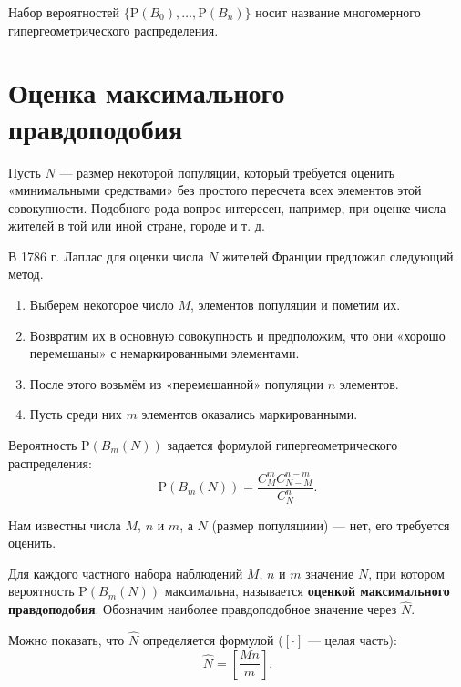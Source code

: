 \documentclass[11pt,a4paper]{article}
\providecommand{\tightlist}{%
      \setlength{\itemsep}{0pt}\setlength{\parskip}{0pt}}
\begin{document}
Набор вероятностей \(\{\mathrm{P}(B_0), \ldots,\mathrm{P}(B_n)\}\) носит
название многомерного гипергеометрического распределения.

    \hypertarget{ux43eux446ux435ux43dux43aux430-ux43cux430ux43aux441ux438ux43cux430ux43bux44cux43dux43eux433ux43e-ux43fux440ux430ux432ux434ux43eux43fux43eux434ux43eux431ux438ux44f}{%
\section{Оценка максимального
правдоподобия}\label{ux43eux446ux435ux43dux43aux430-ux43cux430ux43aux441ux438ux43cux430ux43bux44cux43dux43eux433ux43e-ux43fux440ux430ux432ux434ux43eux43fux43eux434ux43eux431ux438ux44f}}

Пусть \(N\) --- размер некоторой популяции, который требуется оценить
«минимальными средствами» без простого пересчета всех элементов этой
совокупности. Подобного рода вопрос интересен, например, при оценке
числа жителей в той или иной стране, городе и т. д.

В 1786 г. Лаплас для оценки числа \(N\) жителей Франции предложил
следующий метод.

\begin{enumerate}
\def\labelenumi{\arabic{enumi}.}
\tightlist
\item
  Выберем некоторое число \(M\), элементов популяции и пометим их.
\item
  Возвратим их в основную совокупность и предположим, что они «хорошо
  перемешаны» с немаркированными элементами.
\item
  После этого возьмём из «перемешанной» популяции \(n\) элементов.
\item
  Пусть среди них \(m\) элементов оказались маркированными.
\end{enumerate}

Вероятность \(\mathrm{P}(B_m(N))\) задается формулой
гипергеометрического распределения: \[
    \mathrm{P}(B_m(N)) = \frac{C_M^m C_{N-M}^{n-m}}{C_N^n}. \tag{1}\label{eq:prob}
\]

Нам известны числа \(M\), \(n\) и \(m\), а \(N\) (размер популяциии) ---
нет, его требуется оценить.

Для каждого частного набора наблюдений \(M\), \(n\) и \(m\) значение
\(N\), при котором вероятность \(\mathrm{P}(B_m(N))\) максимальна,
называется \textbf{оценкой максимального правдоподобия}. Обозначим
наиболее правдоподобное значение через \(\hat{N}\).

Можно показать, что \(\hat{N}\) определяется формулой (\([\cdot]\) ---
целая часть):
\[ \hat{N} = \left[\dfrac{Mn}{m}\right]. \tag{2}\label{eq:max} \]
\end{document}
